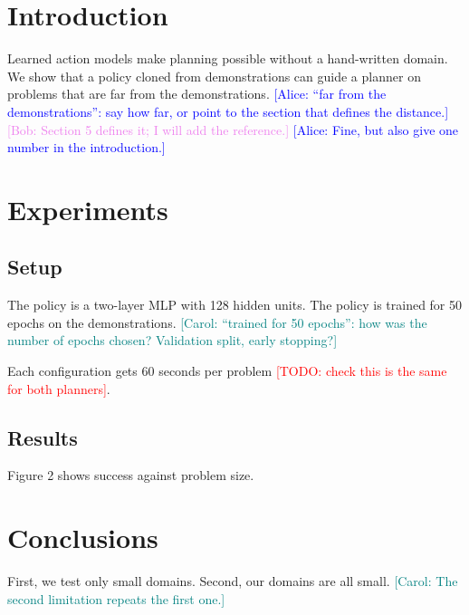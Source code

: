 \documentclass{article}
\newif\ifaddcomments\addcommentstrue
\newcommand{\todo}[1]{\ifaddcomments{\textcolor{red}{[TODO: #1]}}\fi}
\newcommand{\alice}[1]{\ifaddcomments{\textcolor{blue}{[Alice: #1]}}\fi}
\newcommand{\bob}[1]{\ifaddcomments{\textcolor{violet}{[Bob: #1]}}\fi}
\newcommand{\carol}[1]{\ifaddcomments{\textcolor{teal}{[Carol: #1]}}\fi}
\begin{document}
\section{Introduction}
Learned action models make planning possible without a hand-written domain.
We show that a policy cloned from demonstrations can guide a planner on problems that are far from the demonstrations.
\alice{``far from the demonstrations'': say how far, or point to the section that defines the distance.}
\bob{Section 5 defines it; I will add the reference.}
\alice{Fine, but also give one number in the introduction.}

\section{Experiments}
\subsection{Setup}
The policy is a two-layer MLP with 128 hidden units.
The policy is trained for 50 epochs on the demonstrations.
\carol{``trained for 50 epochs'': how was the number of epochs chosen? Validation split, early stopping?}

Each configuration gets 60 seconds per problem \todo{check this is the same for both planners}.

\subsection{Results}
Figure 2 shows success against problem size.

\section{Conclusions}
First, we test only small domains.
Second, our domains are all small.
\carol{The second limitation repeats the first one.}
\end{document}
